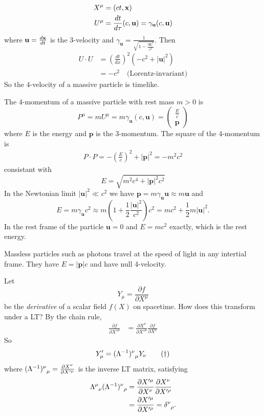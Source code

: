 \documentclass{article}
\newcommand{\glg}{\phantom{\mu}}
\begin{document}
\begin{align*}
	X^\mu &= (ct,\mathbf{x}) \\
	U^\mu &= \frac{dt}{d\tau}(c,\mathbf u) = \gamma_{\mathbf u} (c,\mathbf u)
\end{align*}
where $ \mathbf u = \frac{d\mathbf{x}}{dt} $ is the $ 3 $-velocity and $ \gamma_{\mathbf u}= \frac 1{\sqrt{1-\frac{|\mathbf u|^2}{c^2}}} $. Then
\begin{align*}
	U\cdot U &= \left(\frac{dt}{dx}\right)^2(-c^2+|\mathbf u|^2)\\
		 &=-c^2 \quad\text{(Lorentz-invariant)}
\end{align*}
So the $ 4 $-velocity of a massive particle is timelike.\par
The $ 4 $-momentum of a massive particle with rest mass $ m>0 $ is
\[
	P^\mu = mU^\mu = m\gamma_{\mathbf u}(c,\mathbf u) = \begin{pmatrix}
	  \frac Ec \\ \mathbf p
	\end{pmatrix}
\]
where $ E $ is the energy and $ \mathbf p $ is the $ 3 $-momentum. The square of the $ 4 $-momentum is
\begin{align*}
  P\cdot P = -\left(\frac Ec\right)^2 + |\mathbf p|^2 = - m^2c^2
\end{align*}
consistant with
\[
	E = \sqrt{m^2c^4+|\mathbf p|^2c^2}
\]
In the Newtonian limit $ |\mathbf u|^2 \ll c^2 $ we have $ \mathbf p = m\gamma_{\mathbf u}\mathbf u \approx m\mathbf u $ and 
\[
	E = m\gamma_{\mathbf u}c^2\approx m\left(1+\frac 12 \frac{|\mathbf u|^2}{c^2}\right)c^2 = mc^2 + \frac 12 m|\mathbf u|^2.
\]
In the rest frame of the particle $ \mathbf u = 0 $ and $ E=mc^2 $ exactly, which is the rest energy.
\par
Massless particles such as photons travel at the speed of light in any intertial frame. They have $ E=|\mathbf p|c $ and have null 4-velocity.
\par
Let
\[
	Y_\mu = \frac{\partial f}{\partial X^\mu}
\]
be the \textit{derivative} of a scalar field $ f(X) $ on spacetime. How does this transform under a LT? By the chain rule,
\begin{align*}
	\frac{\partial f}{\partial X'^\mu} &=\frac{\partial X^\nu}{\partial X'^\mu}\frac{\partial f}{\partial X^\nu}
\end{align*}
So
\[
	Y'_\mu = (\inv \Lambda)^\nu_{\glg \mu}Y_\nu \tag{$\dagger$}
\]
where $ (\inv \Lambda)^\nu_{\glg \mu} = \frac{\partial X^\nu}{\partial X'^\mu} $ is the inverse LT matrix, satisfying
\begin{align*}
	\Lambda^\mu_{\glg \nu}(\inv \Lambda)^\nu_{\glg \rho} &= \frac{\partial X'^\mu}{\partial X^\nu}\frac{\partial X^\nu}{\partial X'^\rho} \\
							     &= \frac{\partial X'^\mu}{\partial X'^\rho} = \delta^\nu_{\glg \rho}.
\end{align*}
\end{document}
